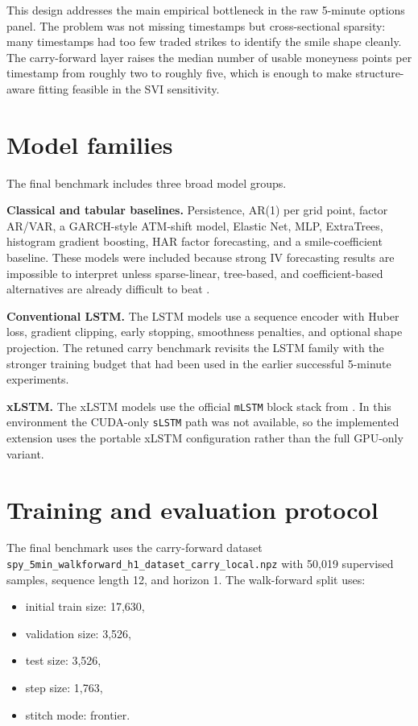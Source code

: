 \documentclass[12pt]{report}
\newcommand{\code}[1]{\texttt{#1}}
\begin{document}
This design addresses the main empirical bottleneck in the raw 5-minute options panel. The problem was not missing timestamps but cross-sectional sparsity: many timestamps had too few traded strikes to identify the smile shape cleanly. The carry-forward layer raises the median number of usable moneyness points per timestamp from roughly two to roughly five, which is enough to make structure-aware fitting feasible in the SVI sensitivity.

\section{Model families}
The final benchmark includes three broad model groups.

\textbf{Classical and tabular baselines.} Persistence, AR(1) per grid point, factor AR/VAR, a GARCH-style ATM-shift model, Elastic Net, MLP, ExtraTrees, histogram gradient boosting, HAR factor forecasting, and a smile-coefficient baseline. These models were included because strong IV forecasting results are impossible to interpret unless sparse-linear, tree-based, and coefficient-based alternatives are already difficult to beat \citep{chen2024bspline,corsi2009}.

\textbf{Conventional LSTM.} The LSTM models use a sequence encoder with Huber loss, gradient clipping, early stopping, smoothness penalties, and optional shape projection. The retuned carry benchmark revisits the LSTM family with the stronger training budget that had been used in the earlier successful 5-minute experiments.

\textbf{xLSTM.} The xLSTM models use the official \code{mLSTM} block stack from \citet{beck2024xlstm}. In this environment the CUDA-only \code{sLSTM} path was not available, so the implemented extension uses the portable xLSTM configuration rather than the full GPU-only variant.

\section{Training and evaluation protocol}
The final benchmark uses the carry-forward dataset \code{spy\_5min\_walkforward\_h1\_dataset\_carry\_local.npz} with 50,019 supervised samples, sequence length 12, and horizon 1. The walk-forward split uses:
\begin{itemize}[leftmargin=1.2cm]
    \item initial train size: 17,630,
    \item validation size: 3,526,
    \item test size: 3,526,
    \item step size: 1,763,
    \item stitch mode: frontier.
\end{itemize}
\end{document}
